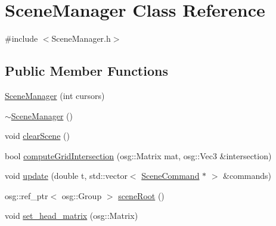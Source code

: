 \hypertarget{class_scene_manager}{
\section{SceneManager Class Reference}
\label{class_scene_manager}
}


{\ttfamily \#include $<$SceneManager.h$>$}\subsection*{Public Member Functions}
\begin{DoxyCompactItemize}
\item 
\hyperlink{class_scene_manager_ad12a7ec5b2fa034bc4462e27d86439c0}{SceneManager} (int cursors)
\item 
\hyperlink{class_scene_manager_a2bb376a85d29e85f47753e26c7539229}{$\sim$SceneManager} ()
\item 
void \hyperlink{class_scene_manager_ad6525bc44ad7ce3cd05f8569806cc826}{clearScene} ()
\item 
bool \hyperlink{class_scene_manager_a4bc5637a92002e8152964bde00eef4bc}{computeGridIntersection} (osg::Matrix mat, osg::Vec3 \&intersection)
\item 
void \hyperlink{class_scene_manager_a9d9313b526dfc9c901cd22c98432bdd0}{update} (double t, std::vector$<$ \hyperlink{class_scene_command}{SceneCommand} $\ast$ $>$ \&commands)
\item 
osg::ref\_\-ptr$<$ osg::Group $>$ \hyperlink{class_scene_manager_a7e94d848584c338244f3be28964de339}{sceneRoot} ()
\item 
void \hyperlink{class_scene_manager_a7e94ed11f1b76b95189c13cdf70a4e6b}{set\_\-head\_\-matrix} (osg::Matrix)
\end{DoxyCompactItemize}
